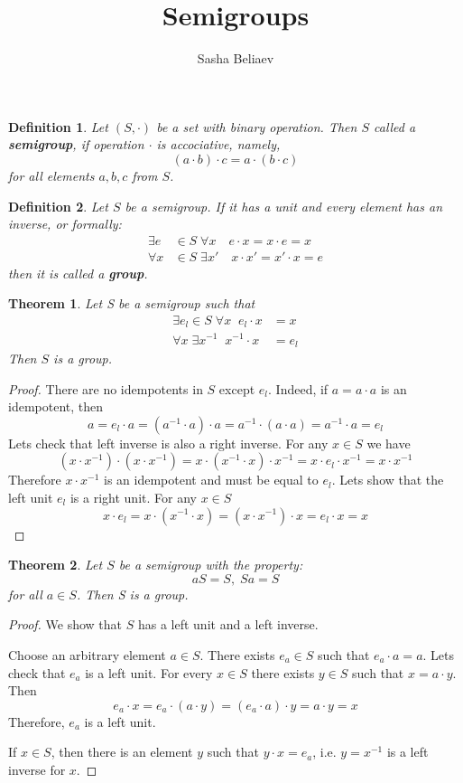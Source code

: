 \documentclass{article}
\title{Semigroups}
\author{Sasha Beliaev}
\newtheorem{definition}{Definition}
\newtheorem{thm}{Theorem}
\begin{document}
\maketitle
\begin{definition}
    Let $(S, \cdot)$ be a set with binary operation. 
    Then $S$ called a \textbf{semigroup}, if operation $\cdot$ is accociative, namely,
    \[
        (a\cdot b)\cdot c= a\cdot (b\cdot c)
        \] 
    for all elements $a, b, c$ from $S$.
\end{definition}
\begin{definition}
    Let $S$ be a semigroup. If it has a unit and every element 
    has an inverse, or formally:
    \begin{align}
        \exists e&\in S\;\forall x\quad e\cdot x=x\cdot e = x\\
        \forall x&\in S\;\exists x'\quad x\cdot x'= x'\cdot x = e
    \end{align}
    then it is called a \textbf{group}.
\end{definition}
\begin{thm}
    Let S be a semigroup such that
    \begin{align}
        \exists e_l\in S\;\forall x\;\; e_l\cdot x &= x\\
        \forall x\;\exists x^{-1}\;\; x^{-1}\cdot x &= e_l 
    \end{align}
    Then $S$ is a group.
\end{thm}
\begin{proof}
There are no idempotents in $S$ except $e_l$. Indeed, if $a=a\cdot a$ is an 
idempotent, then
\[
a = e_l\cdot a = (a^{-1}\cdot a)\cdot a = 
a^{-1}\cdot(a\cdot a) = a^{-1}\cdot a = e_l
\]
Lets check that left inverse is also a right inverse. For any $x\in S$ we have
\[
    (x\cdot x^{-1})\cdot (x\cdot x^{-1}) = x\cdot(x^{-1}\cdot x)\cdot x^{-1} =
    x\cdot e_l\cdot x^{-1} = x\cdot x^{-1}
\]
Therefore $x\cdot x^{-1}$ is an idempotent and must be equal to $e_l$.
Lets show that the left unit $e_l$ is a right unit. For any $x\in S$
\[
    x\cdot e_l = x\cdot(x^{-1}\cdot x) = (x\cdot x^{-1})\cdot x = 
    e_l\cdot x = x
\]
\end{proof}

\begin{thm}
    Let $S$ be a semigroup with the property:
    \[
        aS = S,\;Sa=S    
    \]
    for all $a\in S$. Then S is a group.
\end{thm}
\begin{proof}
    We show that $S$ has a left unit and a left inverse.

    Choose an arbitrary element $a\in S$. There exists $e_a\in S$ such that $e_a\cdot a = a$.
    Lets check that $e_a$ is a left unit. For every $x\in S$ there exists 
    $y\in S$ such that $x = a\cdot y$. Then
    \[
        e_a\cdot x = e_a\cdot(a\cdot y) = (e_a\cdot a)\cdot y=a\cdot y=x
        \]
    Therefore, $e_a$ is a left unit.

    If $x\in S$, then there is an element $y$ such that $y\cdot x=e_a$, i.e. $y=x^{-1}$
    is a left inverse for $x$.
\end{proof}
\end{document}
